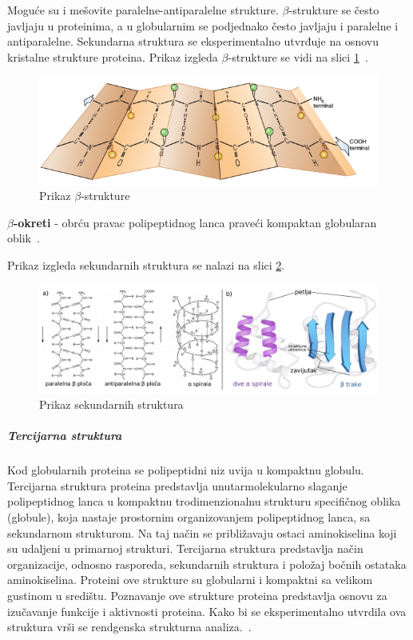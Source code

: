 Moguće su i mešovite paralelne-antiparalelne strukture.
$\beta$-strukture se često javljaju u proteinima, a u globularnim se podjednako često javljaju i paralelne i antiparalelne. Sekundarna struktura se eksperimentalno utvrđuje na osnovu kristalne strukture proteina.
Prikaz izgleda $\beta$-strukture se vidi na slici \ref{fig:beta}~\cite{spasic, Principi}.\\
\begin{figure}[h]
	\centering
    \includegraphics[width=1\textwidth]{Figures/BO/beta.png}
    \caption{Prikaz $\beta$-strukture~\cite{bmbg}}
    \label{fig:beta}
\end{figure}
\textbf{$\beta$-okreti} - obrću pravac polipeptidnog lanca praveći kompaktan globularan oblik~\cite{lippincott}. 
 
Prikaz izgleda sekundarnih struktura se nalazi na slici \ref{fig:ab}.
\begin{figure}[h]
	\centering
    \includegraphics[width=1\textwidth]{Figures/BO/sec_structure.png}
    \caption{Prikaz sekundarnih struktura~\cite{Vinterhalter}}
    \label{fig:ab}
\end{figure}

\subparagraph{Tercijarna struktura}
Kod globularnih proteina se polipeptidni niz uvija u kompaktnu globulu. Tercijarna struktura proteina predstavlja unutarmolekularno slaganje polipeptidnog lanca u kompaktnu trodimenzionalnu strukturu specifičnog oblika (globule), koja nastaje prostornim organizovanjem polipeptidnog lanca, sa sekundarnom strukturom. Na taj način se približavaju ostaci aminokiselina koji su udaljeni u primarnoj strukturi. Tercijarna struktura predstavlja način organizacije, odnosno rasporeda, sekundarnih struktura i položaj bočnih ostataka aminokiselina. Proteini ove strukture su globularni i kompaktni sa velikom gustinom u središtu. Poznavanje ove strukture proteina predstavlja osnovu za izučavanje funkcije i aktivnosti proteina. Kako bi se eksperimentalno utvrdila ova struktura vrši se rendgenska strukturna analiza.~\cite{spasic,medbio, Principi}.

